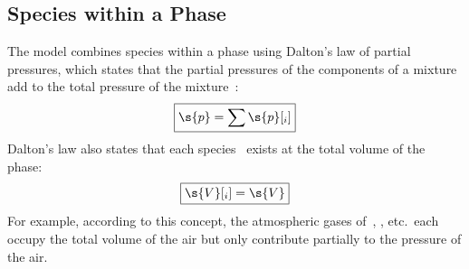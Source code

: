 





\subsection{Species within a Phase}
\label{sec:DaltonsLaw}

The model combines species within a phase using Dalton's law of partial pressures, which states that the partial pressures of the components of a mixture add to the total pressure of the mixture~\cite{Bejan2006}:%
\begin{equation}
  \boxed{\s{p} = \sum\s{p}[_i]}
\end{equation}
Dalton's law also states that each species~ exists at the total volume of the phase:
\begin{equation}
  \boxed{\s{V}[_i] = \s{V}}
\end{equation}
For example, according to this concept, the atmospheric gases of~, , etc.\ each occupy the total volume of the air but only contribute partially to the pressure of the air.


